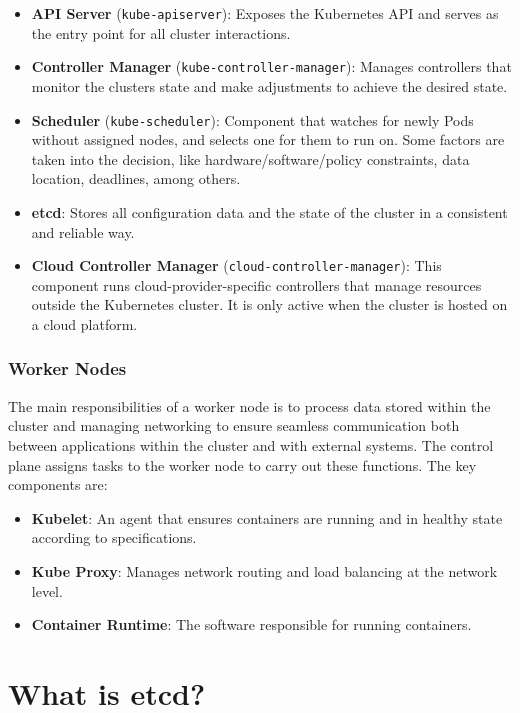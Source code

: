 \documentclass[a4paper,11pt,openright,BCOR=15mm]{scrbook}
\begin{document}
\begin{itemize}
	\item \textbf{API Server} (\texttt{kube-apiserver}): Exposes the Kubernetes API and serves as the entry point for all cluster interactions.
	\item \textbf{Controller Manager} (\texttt{kube-controller-manager}): Manages controllers that monitor the clusters state and make adjustments to achieve the desired state.
	\item \textbf{Scheduler} (\texttt{kube-scheduler}): Component that watches for newly Pods without assigned nodes, and selects one for them to run on. Some factors are taken into the decision, like hardware/software/policy constraints, data location, deadlines, among others.
	\item \textbf{etcd}: Stores all configuration data and the state of the cluster in a consistent and reliable way.
	\item \textbf{Cloud Controller Manager} (\texttt{cloud-controller-manager}): This component runs cloud-provider-specific controllers that manage resources outside the Kubernetes cluster. It is only active when the cluster is hosted on a cloud platform.
\end{itemize}

\subsubsection{Worker Nodes}

The main responsibilities of a worker node is to process data stored within the cluster and managing networking to ensure seamless communication both between applications within the cluster and with external systems. The control plane assigns tasks to the worker node to carry out these functions. The key components are:

\begin{itemize}
	\item \textbf{Kubelet}: An agent that ensures containers are running and in healthy state according to specifications.
	\item \textbf{Kube Proxy}: Manages network routing and load balancing at the network level.
	\item \textbf{Container Runtime}: The software responsible for running containers.
\end{itemize}

\section{What is etcd?}
\end{document}
